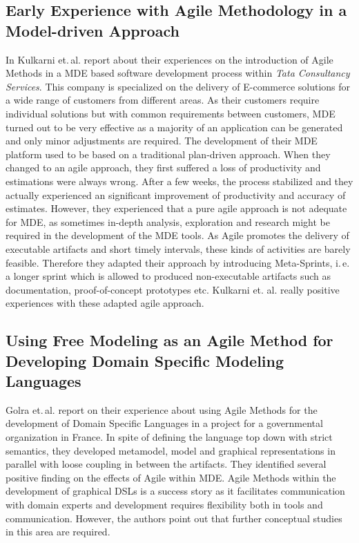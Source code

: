 \documentclass[10pt, a4paper, twocolumn]{article}
\begin{document}
\subsection{Early Experience with Agile Methodology in a Model-driven Approach}

In \cite{11} Kulkarni et.\,al. report about their experiences on the introduction of Agile Methods in a MDE based software development process within \emph{Tata Consultancy Services}.
This company is specialized on the delivery of E-commerce solutions for a wide range of customers from different areas.
As their customers require individual solutions but with common requirements between customers, MDE turned out to be very effective as a majority of an application can be generated and only minor adjustments are required.
The development of their MDE platform used to be based on a traditional plan-driven approach. 
When they changed to an agile approach, they first suffered a loss of productivity and estimations were always wrong. 
After a few weeks, the process stabilized and they actually experienced an significant improvement of productivity and accuracy of estimates.
However, they experienced that a pure agile approach is not adequate for MDE, as sometimes in-depth analysis, exploration and research might be required in the development of the MDE tools.
As Agile promotes the delivery of executable artifacts and short timely intervals, these kinds of activities are barely feasible.
Therefore they adapted their approach by introducing Meta-Sprints, i.\,e. a longer sprint which is allowed to produced non-executable artifacts such as documentation, proof-of-concept prototypes etc.
Kulkarni et. al. really positive experiences with these adapted agile approach.

\subsection{Using Free Modeling as an Agile Method for Developing Domain Specific Modeling Languages}

Golra et.\,al. \cite{12} report on their experience about using Agile Methods for the development of Domain Specific Languages in a project for a governmental organization in France.
In spite of defining the language top down with strict semantics, they developed metamodel, model and graphical representations in parallel with loose coupling in between the artifacts.
They identified several positive finding on the effects of Agile within MDE.
Agile Methods within the development of graphical DSLs is a success story as it facilitates communication with domain experts and development requires flexibility both in tools and communication.
However, the authors point out that further conceptual studies in this area are required.
 
\end{document}
